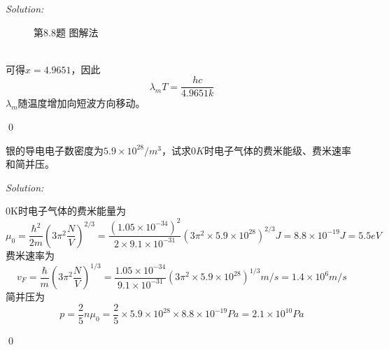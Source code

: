 \documentclass[12pt,a4paper]{article}
\newenvironment{problem}[2][Problem]{\begin{trivlist}
\item[\hskip \labelsep {\bfseries #1}\hskip \labelsep {\bfseries #2.}]}{\end{trivlist}}
\newenvironment{sol}
    {\emph{Solution:}
    }
    {
    \qed
    }
\begin{document}
\begin{sol}
\begin{figure}[h]
\caption{第8.8题 图解法}
\end{figure}
\\可得$x=4.9651$，因此
\begin{equation}
\lambda_mT=\frac{hc}{4.9651k}
\end{equation}
$\lambda_m$随温度增加向短波方向移动。
\end{sol}

\begin{problem}{8.13}
银的导电电子数密度为$5.9\times10^{28}/m^3$，试求$0K$时电子气体的费米能级、费米速率和简并压。
\end{problem}
\begin{sol}
$0$K时电子气体的费米能量为
\begin{equation}
\mu_0=\frac{\hbar^2}{2m}\left(3\pi^2\frac{N}{V}\right)^{2/3}=\frac{(1.05\times10^{-34})^2}{2\times9.1\times10^{-31}}\left(3\pi^2\times5.9\times10^{28}\right)^{2/3}J=8.8\times10^{-19}J=5.5eV
\end{equation}
费米速率为
\begin{equation}
v_F=\frac{\hbar}{m}\left(3\pi^2\frac{N}{V}\right)^{1/3}=\frac{1.05\times10^{-34}}{9.1\times10^{-31}}\left(3\pi^2\times5.9\times10^{28}\right)^{1/3}m/s=1.4\times10^6m/s
\end{equation}
简并压为
\begin{equation}
p=\frac{2}{5}n\mu_0=\frac{2}{5}\times5.9\times10^{28}\times8.8\times10^{-19}Pa=2.1\times10^{10}Pa
\end{equation}
\end{sol}
\end{document}
